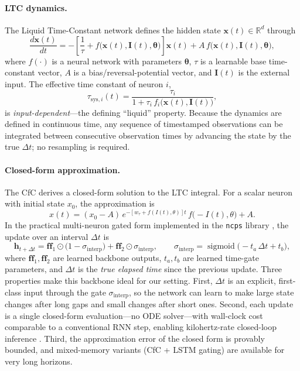 \documentclass[conference]{IEEEtran}
\begin{document}
\paragraph{LTC dynamics.}
The Liquid Time-Constant network \cite{hasani2021ltc} defines the hidden state $\mathbf{x}(t) \in \mathbb{R}^d$ through
\begin{equation}\label{eq:ltc}
\frac{d\mathbf{x}(t)}{dt} = -\left[\frac{1}{\tau} + f\bigl(\mathbf{x}(t), \mathbf{I}(t), \boldsymbol{\theta}\bigr)\right]\mathbf{x}(t) + A\, f\bigl(\mathbf{x}(t), \mathbf{I}(t), \boldsymbol{\theta}\bigr),
\end{equation}
where $f(\cdot)$ is a neural network with parameters $\boldsymbol{\theta}$, $\tau$ is a learnable base time-constant vector, $A$ is a bias/reversal-potential vector, and $\mathbf{I}(t)$ is the external input. The effective time constant of neuron $i$,
\begin{equation}\label{eq:tau}
\tau_{\mathrm{sys},i}(t) = \frac{\tau_i}{1 + \tau_i\, f_i\bigl(\mathbf{x}(t), \mathbf{I}(t)\bigr)},
\end{equation}
is \emph{input-dependent}---the defining ``liquid'' property. Because the dynamics are defined in continuous time, any sequence of timestamped observations can be integrated between consecutive observation times by advancing the state by the true $\Delta t$; no resampling is required.

\paragraph{Closed-form approximation.}
The CfC \cite{hasani2022cfc} derives a closed-form solution to the LTC integral. For a scalar neuron with initial state $x_0$, the approximation is
\begin{equation}\label{eq:cfc}
x(t) = (x_0 - A)\, e^{-\left[w_\tau + f(I(t),\theta)\right]t}\, f\bigl(-I(t), \theta\bigr) + A.
\end{equation}
In the practical multi-neuron gated form implemented in the \texttt{ncps} library \cite{lechner_ncps}, the update over an interval $\Delta t$ is
\begin{equation}\label{eq:gate}
\mathbf{h}_{t+\Delta t} = \mathbf{ff}_1 \odot \bigl(1 - \sigma_{\mathrm{interp}}\bigr) + \mathbf{ff}_2 \odot \sigma_{\mathrm{interp}}, \qquad \sigma_{\mathrm{interp}} = \operatorname{sigmoid}\!\bigl(-t_a\,\Delta t + t_b\bigr),
\end{equation}
where $\mathbf{ff}_1, \mathbf{ff}_2$ are learned backbone outputs, $t_a, t_b$ are learned time-gate parameters, and $\Delta t$ is the \emph{true elapsed time} since the previous update. Three properties make this backbone ideal for our setting. First, $\Delta t$ is an explicit, first-class input through the gate $\sigma_{\mathrm{interp}}$, so the network can learn to make large state changes after long gaps and small changes after short ones. Second, each update is a single closed-form evaluation---no ODE solver---with wall-clock cost comparable to a conventional RNN step, enabling kilohertz-rate closed-loop inference \cite{hasani2022cfc}. Third, the approximation error of the closed form is provably bounded, and mixed-memory variants (CfC + LSTM gating) are available for very long horizons.
\end{document}
